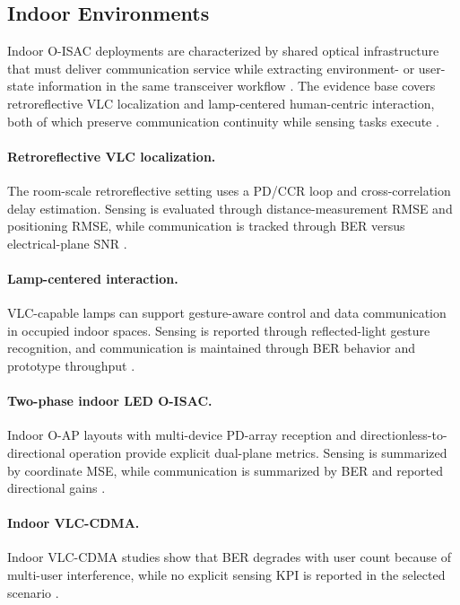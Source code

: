 \subsection{Indoor Environments}
\label{subsec:apps-indoor}

Indoor O-ISAC deployments are characterized by shared optical infrastructure that must deliver communication service while extracting environment- or user-state information in the same transceiver workflow \cite{O_ISAC_011,O_ISAC_030}. The evidence base covers retroreflective VLC localization and lamp-centered human-centric interaction, both of which preserve communication continuity while sensing tasks execute \cite{O_ISAC_011,O_ISAC_030}.

\paragraph{Retroreflective VLC localization.}
The room-scale retroreflective setting uses a PD/CCR loop and cross-correlation delay estimation. Sensing is evaluated through distance-measurement RMSE and positioning RMSE, while communication is tracked through BER versus electrical-plane SNR \cite{O_ISAC_011}.

\paragraph{Lamp-centered interaction.}
VLC-capable lamps can support gesture-aware control and data communication in occupied indoor spaces. Sensing is reported through reflected-light gesture recognition, and communication is maintained through BER behavior and prototype throughput \cite{O_ISAC_030}.

\paragraph{Two-phase indoor LED O-ISAC.}
Indoor O-AP layouts with multi-device PD-array reception and directionless-to-directional operation provide explicit dual-plane metrics. Sensing is summarized by coordinate MSE, while communication is summarized by BER and reported directional gains \cite{O_ISAC_108}.

\paragraph{Indoor VLC-CDMA.}
Indoor VLC-CDMA studies show that BER degrades with user count because of multi-user interference, while no explicit sensing KPI is reported in the selected scenario \cite{O_ISAC_388}.

